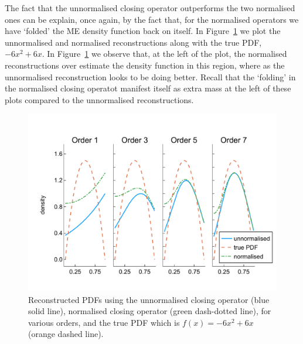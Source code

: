 The fact that the unnormalised closing operator outperforms the two normalised ones can be explain, once again, by the fact that, for the normalised operators we have `folded' the ME density function back on itself. In Figure~\ref{fig: pdf reconstructed quadratic} we plot the unnormalised and normalised reconstructions along with the true PDF, \(-6x^2+6x\). In Figure~\ref{fig: pdf reconstructed quadratic} we observe that, at the left of the plot, the normalised reconstructions over estimate the density function in this region, where as the unnormalised reconstruction looks to be doing better. Recall that the `folding' in the normalised closing operatot manifest itself as extra mass at the left of these plots compared to the unnormalised reconstructions. 
\begin{figure}
	\centering
	\includegraphics[width=\textwidth]{chapter5/figs/qbdrap_closing_vec/fun6/pdfs_formatted.pdf}
	\caption{Reconstructed PDFs using the unnormalised closing operator (blue solid line), normalised closing operator (green dash-dotted line), for various orders, and the true PDF which is \(f(x)=-6x^2+6x\) (orange dashed line).}
	\label{fig: pdf reconstructed quadratic}
\end{figure} 

